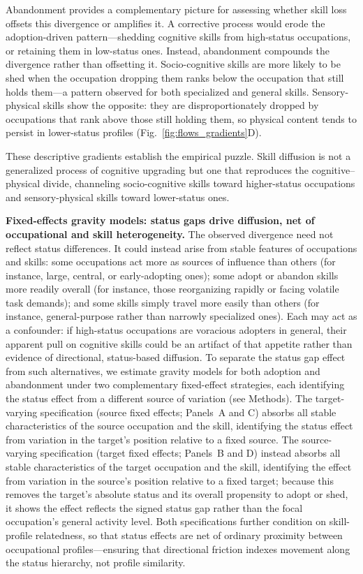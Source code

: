 \documentclass[11pt, letterpaper]{article} %
\begin{document}
Abandonment provides a complementary picture for assessing whether skill loss offsets this divergence or amplifies it. A corrective process would erode the adoption-driven pattern—shedding cognitive skills from high-status occupations, or retaining them in low-status ones. Instead, abandonment compounds the divergence rather than offsetting it. Socio-cognitive skills are more likely to be shed when the occupation dropping them ranks below the occupation that still holds them—a pattern observed for both specialized and general skills. Sensory-physical skills show the opposite: they are disproportionately dropped by occupations that rank above those still holding them, so physical content tends to persist in lower-status profiles (Fig.~\ref{fig:flows_gradients}D).

These descriptive gradients establish the empirical puzzle. Skill diffusion is not a generalized process of cognitive upgrading but one that reproduces the cognitive--physical divide, channeling socio-cognitive skills toward higher-status occupations and sensory-physical skills toward lower-status ones.



\textbf{Fixed-effects gravity models: status gaps drive diffusion, net of occupational and skill heterogeneity.} The observed divergence need not reflect status differences. It could instead arise from stable features of occupations and skills: some occupations act more as sources of influence than others (for instance, large, central, or early-adopting ones); some adopt or abandon skills more readily overall (for instance, those reorganizing rapidly or facing volatile task demands); and some skills simply travel more easily than others (for instance, general-purpose rather than narrowly specialized ones). Each may act as a confounder: if high-status occupations are voracious adopters in general, their apparent pull on cognitive skills could be an artifact of that appetite rather than evidence of directional, status-based diffusion. To separate the status gap effect from such alternatives, we estimate gravity models for both adoption and abandonment under two complementary fixed-effect strategies, each identifying the status effect from a different source of variation (see Methods). The target-varying specification (source fixed effects; Panels~A and C) absorbs all stable characteristics of the source occupation and the skill, identifying the status effect from variation in the target's position relative to a fixed source. The source-varying specification (target fixed effects; Panels~B and D) instead absorbs all stable characteristics of the target occupation and the skill, identifying the effect from variation in the source's position relative to a fixed target; because this removes the target's absolute status and its overall propensity to adopt or shed, it shows the effect reflects the signed status gap rather than the focal occupation's general activity level. Both specifications further condition on skill-profile relatedness, so that status effects are net of ordinary proximity between occupational profiles—ensuring that directional friction indexes movement along the status hierarchy, not profile similarity. 
\end{document}
